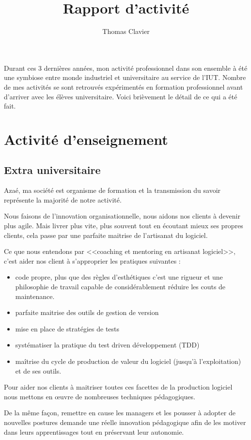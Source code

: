 \documentclass[a4paper]{article}
\title{Rapport d’activité}
\author{Thomas Clavier}
\begin{document}
\maketitle

Durant ces 3 dernières années, mon activité professionnel dans son ensemble à été une symbiose entre monde industriel et universitaire au service de l'IUT. 
Nombre de mes activités se sont retrouvés expérimentés en formation professionnel avant d'arriver avec les élèves universitaire.
Voici brièvement le détail de ce qui a été fait.

\section{Activité d'enseignement}
\subsection{Extra universitaire}
Azaé, ma société est organisme de formation et la transmission du savoir représente la majorité de notre activité.

Nous faisons de l'innovation organisationnelle, nous aidons nos clients à devenir plus agile. Mais livrer plus vite, plus souvent tout en écoutant mieux ses propres clients, cela passe par une parfaite maitrise de l'artisanat du logiciel.

Ce que nous entendons par <<coaching et mentoring en artisanat logiciel>>, c'est aider nos client à s'approprier les pratiques suivantes : 
\begin{itemize}
  \item code propre, plus que des règles d'esthétiques c'est une rigueur et une philosophie de travail capable de considérablement réduire les couts de maintenance.
  \item parfaite maitrise des outils de gestion de version
  \item mise en place de stratégies de tests 
  \item systématiser la pratique du test driven développement (TDD)
  \item maîtrise du cycle de production de valeur du logiciel (jusqu'à l'exploitation) et de ses outils.
\end{itemize}

Pour aider nos clients à maitriser toutes ces facettes de la production logiciel nous mettons en œuvre de nombreuses techniques pédagogiques.

De la même façon, remettre en cause les managers et les pousser à adopter de nouvelles postures demande une réelle innovation pédagogique afin de les motiver dans leurs apprentissages tout en préservant leur autonomie. 
\end{document}
